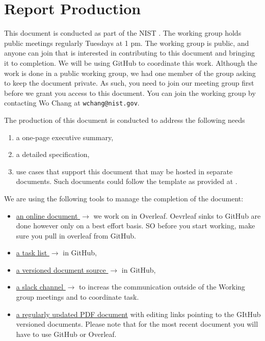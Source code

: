 
\section*{Report Production}


This document is conducted as part of the NIST \WG. The working group
holds public meetings regularly Tuesdays at 1 pm. The
working group is public, and anyone can join that is interested in
contributing to this document and bringing it to completion. We will
be using GitHub to coordinate this work. Although the work is done in
a public working group, we had one member of the group asking to keep
the document private. As such, you need to join our meeting group first
before we grant you access to this document. You can join the working
group by contacting Wo Chang at \verb|wchang@nist.gov|.


The production of this document is conducted to address the following
needs

\begin{enumerate}
  \item a one-page executive summary, 

  \item a detailed specification,

  \item use cases that support this document that may be hosted in
    separate documents. Such documents could follow the template as
    provided at \cite{nist-bigdatawg}.

\end{enumerate}


\parindent0pt We are using the following tools to manage the completion of
the document:

\begin{itemize}

\item
  \href{https://www.overleaf.com/project/619ba513e4aade4400e06df8}{an
    online document $\rightarrow$} we work on in Overleaf. Oevrleaf
  sinks to GitHub are done however only on a best effort basis. SO
  before you start working, make sure you pull in overleaf from
  GitHub.

\item \href{https://github.com/orgs/cyberaide/projects/1}{a task list
  $\rightarrow$} in GitHub,

\item \href{https://github.com/orgs/cyberaide/}{a versioned document
  source $\rightarrow$} in GitHub,

\item \href{https://nist-analytics.slack.com}{a slack channel
  $\rightarrow$} to increas the communication outside of the Working
  group meetings and to coordinate task.

\item
  \href{https://github.com/cyberaide/NIST-analytics/raw/main/NIST-analytics.pdf}{a
    regularly updated PDF document} with editing links pointing to the
  GItHub versioned documents. Please note that for the most recent
  document you will have to use GitHub or Overleaf. 
  
\end{itemize}


